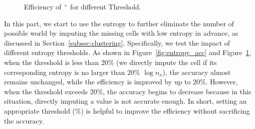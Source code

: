 \begin{figure}[t]
\begin{minipage}[t]{0.3\textwidth}
		\vspace{-1.5em}
		\caption{Efficiency of \ours$^+$ for different Threshold.}
		\label{fig:entropy_time}
	\end{minipage}
	\vspace*{-1em}   
\end{figure}
%
In this part, we start to use the entropy to further eliminate the number of possible world by imputing the missing cells with low entropy in advance, as discussed in Section~\ref{subsec:clustering}. 
%
Specifically, we test the impact of different entropy thresholds. As shown in Figure~\ref{fig:entropy_acc} and Figure~\ref{fig:entropy_time}, when the threshold is less than  20\% (\ie we directly impute the cell if its corresponding entropy is no larger than 20\% $\log n_x$), the accuracy almost remains unchanged, while the efficiency is improved by up to 20\%. However, when the threshold exceeds 20\%, the accuracy begins to decrease because in this situation, directly imputing a value is not accurate enough. In short, setting an appropriate threshold (\%) is helpful to improve the efficiency without sacrificing the accuracy. 


%
